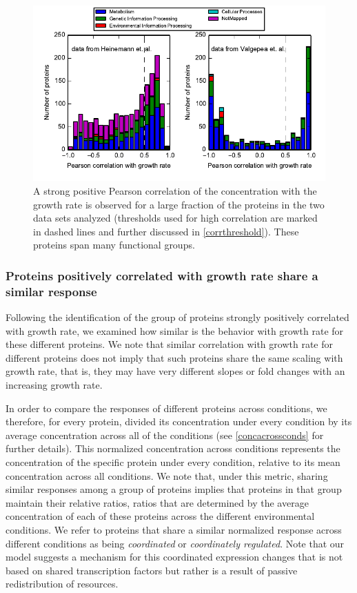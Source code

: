 \documentclass[a4paper]{article}
\begin{document}
\begin{figure}[H]
\begin{center}
\includegraphics[width=1\columnwidth]{GrowthRateCorrelation.pdf}
\caption{\label{fig:growthcorr}
A strong positive Pearson correlation of the concentration with the growth rate is observed for a large fraction of the proteins in the two data sets analyzed (thresholds used for high correlation are marked in dashed lines and further discussed in \ref{corrthreshold}).
These proteins span many functional groups.
}
\end{center}
\end{figure}

\subsubsection{Proteins positively correlated with growth rate share a similar response}
\label{propchange} 

Following the identification of the group of proteins strongly positively correlated with growth rate, we examined how similar is the behavior with growth rate for these different proteins.
We note that similar correlation with growth rate for different proteins does not imply that such proteins share the same scaling with growth rate, that is,  they may have very different slopes or fold changes with an increasing growth rate.

In order to compare the responses of different proteins across conditions, we therefore, for every protein, divided its concentration under every condition by its average concentration across all of the conditions (see \ref{concacrossconds} for further details).
This normalized concentration across conditions represents the concentration of the specific protein under every condition, relative to its mean concentration across all conditions.
We note that, under this metric, sharing similar responses among a group of proteins implies that proteins in that group maintain their relative ratios, ratios that are determined by the average concentration of each of these proteins across the different environmental conditions.
We refer to proteins that share a similar normalized response across different conditions as being \emph{coordinated} or \emph{coordinately regulated}.
Note that our model suggests a mechanism for this coordinated expression changes that is not based on shared transcription factors but rather is a result of passive redistribution of resources.
\end{document}
